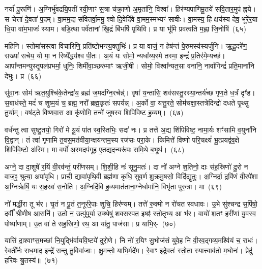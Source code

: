 नर्या॑ पु॒रूणि॑। अ॒ग्निर्भु॑वद्रयि॒पती॑ रयी॒णाꣳ स॒त्रा च॑क्रा॒णो अ॒मृता॑नि॒ विश्वा᳚। हिर॑ण्यपाणिमू॒तये॑ सवि॒तार॒मुप॑ ह्वये। स चेत्ता॑ दे॒वता॑ प॒दम्। वा॒मम॒द्य स॑वितर्वा॒ममु॒ श्वो दि॒वेदि॑वे वा॒मम॒स्मभ्यꣳ॑ सावीः। वा॒मस्य॒ हि क्षय॑स्य देव॒ भूरे॑र॒या धि॒या वा॑म॒भाजः॑ स्याम। बडि॒त्था पर्व॑तानां खि॒द्रं बि॑भर्\mbox{}षि पृथिवि। प्र या भू॑मि प्रवत्वति म॒ह्ना जि॒नोषि॑~(६५)\ip

महिनि। स्तोमा॑सस्त्वा विचारिणि॒ प्रति॑ष्टोभन्त्य॒क्तुभिः॑। प्र या वाजं॒ न हेष॑न्तं पे॒रुमस्य॑स्यर्जुनि। ऋ॒दू॒दरे॑ण॒ सख्या॑ सचेय॒ यो मा॒ न रिष्ये᳚द्धर्यश्व पी॒तः। अ॒यं यः सोमो॒ न्यधा᳚य्य॒स्मे तस्मा॒ इन्द्रं॑ प्र॒तिर॑मे॒म्यच्छ॑। आपा᳚न्तमन्युस्तृ॒पल॑प्रभर्मा॒ धुनिः॒ शिमी॑वा॒ञ्छरु॑माꣳ ऋजी॒षी। सोमो॒ विश्वा᳚न्यत॒सा वना॑नि॒ नार्वागिन्द्रं॑ प्रति॒माना॑नि देभुः। प्र~(६६)\ip

सु॑वा॒नः सोम॑ ऋत॒युश्चि॑के॒तेन्द्रा॑य॒ ब्रह्म॑ ज॒मद॑ग्नि॒रर्चन्न्॑। वृषा॑ य॒न्तासि॒ शव॑सस्तु॒\-रस्या॒न्तर्य॑च्छ गृण॒ते ध॒र्त्रं दृꣳ॑ह। स॒बाध॑स्ते॒ मदं॑ च शुष्म॒यं च॒ ब्रह्म॒ नरो᳚ ब्रह्म॒कृतः॑ सपर्यन्न्। अ॒र्को वा॒ यत्तु॒रते॒ सोम॑चक्षा॒स्तत्रेदिन्द्रो॑ दधते पृ॒थ्सु तु॒र्याम्। वष॑ट्ते विष्णवा॒स आ कृ॑णोमि॒ तन्मे॑ जुषस्व शिपिविष्ट ह॒व्यम्।~(६७)\ip

वर्ध॑न्तु त्वा सुष्टु॒तयो॒ गिरो॑ मे यू॒यं पा॑त स्व॒स्तिभिः॒ सदा॑ नः। प्र तत्ते॑ अ॒द्य शि॑पिविष्ट॒ नामा॒र्यः शꣳ॑सामि व॒युना॑नि वि॒द्वान्। तं त्वा॑ गृणामि त॒वस॒मत॑वीया॒न्क्षय॑न्तम॒स्य रज॑सः परा॒के। किमित्ते॑ विष्णो परि॒चक्ष्यं॑ भू॒त्प्रयद्व॑व॒क्षे शि॑पिवि॒ष्टो अ॑स्मि। मा वर्पो॑ अ॒स्मदप॑गूह ए॒तद्यद॒न्यरू॑पः समि॒थे ब॒भूथ॑।~(६८)\ip

अग्ने॒ दा दा॒शुषे॑ र॒यिं वी॒रव॑न्तं॒ परी॑णसम्। शि॒शी॒हि नः॑ सूनु॒मतः॑। दा नो॑ अग्ने श॒तिनो॒ दाः स॑ह॒स्रिणो॑ दु॒रो न वाज॒ꣴ॒ श्रुत्या॒ अपा॑वृधि। प्राची॒ द्यावा॑\-पृथि॒वी ब्रह्म॑णा कृधि॒ सुव॒र्ण शु॒क्रमु॒षसो॒ विदि॑द्युतुः। अ॒ग्निर्दा॒ द्रवि॑णं वी॒रपे॑शा अ॒ग्निर्\mbox{}ऋषिं॒ यः स॒हस्रा॑ स॒नोति॑। अ॒ग्निर्दि॒वि ह॒व्यमात॑ताना॒ग्नेर्धामा॑नि॒ विभृ॑ता पुरु॒त्रा। मा~(६९)\ip

नो॑ मर्द्धी॒रा तू भ॑र। घृ॒तं न पू॒तं त॒नूर॑रे॒पाः शुचि॒ हिर॑ण्यम्। तत्ते॑ रु॒क्मो न रो॑चत स्वधावः। उ॒भे सु॑श्चन्द्र स॒र्पिषो॒ दर्वी᳚ श्रीणीष आ॒सनि॑। उ॒तो न॒ उत्पु॑पूर्या उ॒क्थेषु॑ शवसस्पत॒ इषꣴ॑ स्तो॒तृभ्य॒ आ भ॑र। वायो॑ श॒तꣳ हरी॑णां यु॒वस्व॒ पोष्या॑णाम्। उ॒त वा॑ ते सह॒स्रिणो॒ रथ॒ आ या॑तु॒ पाज॑सा। प्र याभि॒र्-~(७०)\ip

यासि॑ दा॒श्वाꣳस॒मच्छा॑ नि॒युद्भि॑र्वायवि॒ष्टये॑ दुरो॒णे। नि नो॑ र॒यिꣳ सु॒भोज॑सं युवे॒ह नि वी॒रव॒द्गव्य॒मश्वि॑यं च॒ राधः॑। रे॒वती᳚र्नः सध॒माद॒ इन्द्रे॑ सन्तु तु॒विवा॑जाः। क्षु॒मन्तो॒ याभि॒र्मदे॑म। रे॒वाꣳ इद्रे॒वतः॑ स्तो॒ता स्यात्त्वाव॑तो म॒घोनः॑। प्रेदु॑ हरिवः श्रु॒तस्य॑॥~(७१)\ip

